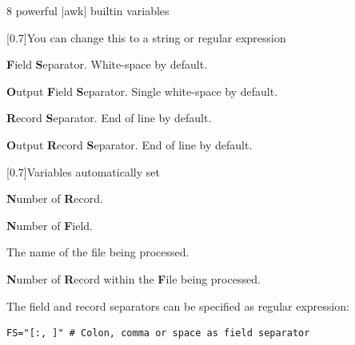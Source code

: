 \begin{frame}[fragile]{8 powerful \bash|awk| builtin variables}
    \vspace{-3mm}
    \begin{varblock}{}[0.7\textwidth]{You can change this to a string or regular expression}
        \begin{description}[XXXXXX]
            \item[\textbf{FS}] \textbf{F}ield \textbf{S}eparator. \alert{White-space} by default.
            \item[\textbf{OFS}] \textbf{O}utput \textbf{F}ield \textbf{S}eparator. \alert{Single white-space} by default.
            \item[\textbf{RS}] \textbf{R}ecord \textbf{S}eparator. \alert{End of line} by default.
            \item[\textbf{ORS}] \textbf{O}utput \textbf{R}ecord \textbf{S}eparator. \alert{End of line} by default.
        \end{description}
    \end{varblock}
    \begin{varblock}{}[0.7\textwidth]{Variables automatically set}
        \begin{description}
            \item[\textbf{NR}] \textbf{N}umber of \textbf{R}ecord.
            \item[\textbf{NF}] \textbf{N}umber of \textbf{F}ield.
            \item[\textbf{FILENAME}] The name of the file being processed.
            \item[\textbf{FNR}] \textbf{N}umber of \textbf{R}ecord within the \textbf{F}ile being processed.
        \end{description}
    \end{varblock}
    \begin{center}
        The field and record separators can be specified as regular expression:
        \begin{lstlisting}[style=MyBash, numbers=none, aboveskip=2mm, xleftmargin=9mm, xrightmargin=9mm]
            FS="[:, ]" # Colon, comma or space as field separator
        \end{lstlisting}
    \end{center}
\end{frame}
